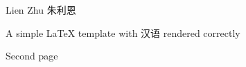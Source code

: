 \documentclass{ctexart}
\newcommand{\bibent}{\noindent \hangindent{ 40pt }}
\newenvironment{workscited}{\newpage \begin{center} Works Cited \end{center}}{\newpage }
\begin{document}
\begin{flushleft}
Lien Zhu 朱利恩\\
\begin{center}
\end{center}
\setlength{\parindent}{0.5in} 


A simple LaTeX template with 汉语 rendered correctly

\newpage

Second page


\end{flushleft}
\end{document}
